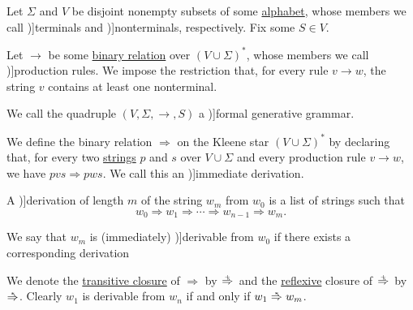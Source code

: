 \begin{definition}\label{def:formal_grammar}
  Let \( \Sigma \) and \( V \) be disjoint nonempty subsets of some \hyperref[def:formal_language]{alphabet}, whose members we call \term[ru=основные (символы) (\cite[27]{Гладкий1973Языки})]{terminals} and \term[ru=вспомогательные (символы) (\cite[27]{Гладкий1973Языки})]{nonterminals}, respectively. Fix some  \( S \in V \).

  Let \( {\to} \) be some \hyperref[def:binary_relation]{binary relation} over \( (V \cup \Sigma)^* \), whose members we call \term[ru=правила (\cite[27]{Гладкий1973Языки})]{production rules}. We impose the restriction that, for every rule \( v \to w \), the string \( v \) contains at least one nonterminal.

  We call the quadruple \( (V, \Sigma, \to, S) \) a \term[ru=(формальная) генеративная грамматика (\cite[10]{Гладкий1973Языки})]{formal generative grammar}.

  \begin{thmenum}
     We define the binary relation \( \Rightarrow \) on the Kleene star \( (V \cup \Sigma)^* \) by declaring that, for every two \hyperref[def:formal_language/string]{strings} \( p \) and \( s \) over \( V \cup \Sigma \) and every production rule \( v \to w \), we have \( pvs \Rightarrow pws \). We call this an \term[ru=непосредственный (вывод) (\cite[28]{Гладкий1973Языки})]{immediate derivation}.

    A \term[ru=вывод (\cite[27]{Гладкий1973Языки})]{derivation} of length \( m \) of the string \( w_m \) from \( w_0 \) is a list of strings such that
    \begin{equation}\label{eq:def:formal_grammar/derivation}
      w_0
      \Rightarrow
      w_1
      \Rightarrow
      \cdots
      \Rightarrow
      w_{n-1}
      \Rightarrow
      w_m.
    \end{equation}

    We say that \( w_m \) is (immediately) \term[ru=выводимая (цепочка) (\cite[27]{Гладкий1973Языки})]{derivable} from \( w_0 \) if there exists a corresponding derivation

    We denote the \hyperref[def:relation_closures/transitive]{transitive closure} of \( \Rightarrow \) by \( \reloset + \Rightarrow \) and the \hyperref[def:relation_closures/reflexive]{reflexive} closure of \( \reloset + \Rightarrow \) by \( \reloset {*} \Rightarrow \). Clearly \( w_1 \) is derivable from \( w_n \) if and only if \( w_1 \reloset {*} \Rightarrow w_m \).


\end{thmenum}
\end{definition}
